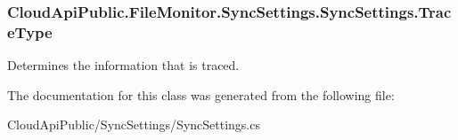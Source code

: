 \hypertarget{class_cloud_api_public_1_1_file_monitor_1_1_sync_settings_1_1_sync_settings_a3b4583948c5e9125a4b273eae17a7f71}{
\subsubsection[{Trace\-Type}]{ Cloud\-Api\-Public.\-File\-Monitor.\-Sync\-Settings.\-Sync\-Settings.\-Trace\-Type\hspace{0.3cm}{\ttfamily [get]}}}\label{class_cloud_api_public_1_1_file_monitor_1_1_sync_settings_1_1_sync_settings_a3b4583948c5e9125a4b273eae17a7f71}


Determines the information that is traced. 



The documentation for this class was generated from the following file\-:\begin{DoxyCompactItemize}
\item 
Cloud\-Api\-Public/\-Sync\-Settings/Sync\-Settings.\-cs\end{DoxyCompactItemize}
